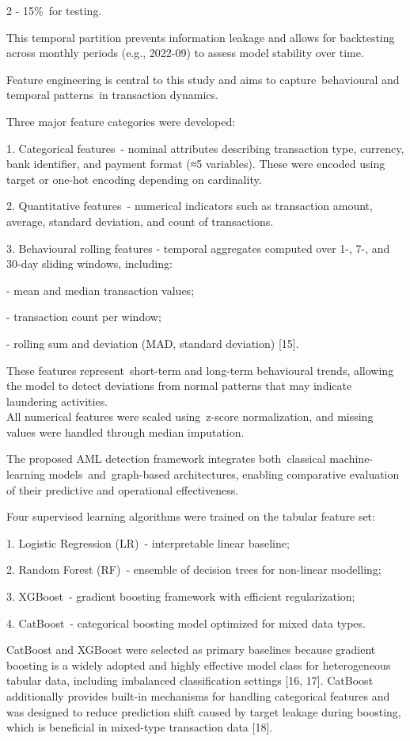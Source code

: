 \begin{multicols}{2}
- 15\%~for testing.

This temporal partition prevents information leakage and allows for
backtesting across monthly periods (e.g., 2022-09) to assess model
stability over time.

Feature engineering is central to this study and aims to
capture~behavioural and temporal patterns~in transaction dynamics.

Three major feature categories were developed:

1. Categorical features~- nominal attributes describing transaction type,
currency, bank identifier, and payment format (≈5 variables). These
were encoded using target or one-hot encoding depending on
cardinality.

2. Quantitative features~- numerical indicators such as transaction
amount, average, standard deviation, and count of transactions.

3. Behavioural rolling features - temporal aggregates computed over 1-,
7-, and 30-day sliding windows, including:

- mean and median transaction values;

- transaction count per window;

- rolling sum and deviation (MAD, standard deviation) {[}15{]}.

These features represent~short-term and long-term behavioural trends,
allowing the model to detect deviations from normal patterns that may
indicate laundering activities.\\
All numerical features were scaled using~z-score normalization,
and missing values were handled through median imputation.

The proposed AML detection framework integrates both~classical
machine-learning models~and~graph-based architectures, enabling
comparative evaluation of their predictive and operational
effectiveness.

Four supervised learning algorithms were trained on the tabular feature
set:

1. Logistic Regression (LR)~- interpretable linear baseline;

2. Random Forest (RF)~- ensemble of decision trees for non-linear
modelling;

3. XGBoost~- gradient boosting framework with efficient regularization;

4. CatBoost~- categorical boosting model optimized for mixed data types.

CatBoost and XGBoost were selected as primary baselines because gradient
boosting is a widely adopted and highly effective model class for
heterogeneous tabular data, including imbalanced classification settings
{[}16, 17{]}. CatBoost additionally provides built-in mechanisms for
handling categorical features and was designed to reduce prediction
shift caused by target leakage during boosting, which is beneficial in
mixed-type transaction data {[}18{]}.


\end{multicols}
